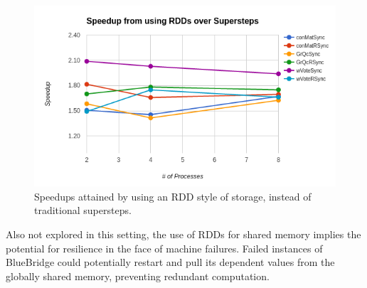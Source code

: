 \begin{figure}[h]
\includegraphics[width=\linewidth]{"fig/rdd_vs_ss"}
\caption{Speedups attained by using an RDD style of storage, instead of
 traditional supersteps.}
\label{fig:rdds}
\end{figure}

Also not explored in this setting, the use of RDDs for shared memory implies the
potential for resilience in the face of machine failures. Failed instances of
BlueBridge could potentially restart and pull its dependent values from the
globally shared memory, preventing redundant computation.
